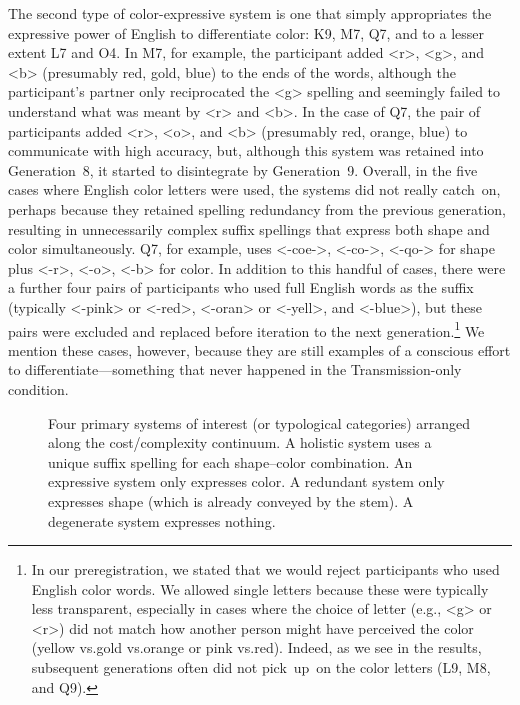 \documentclass[doc,biblatex]{apa7}
\begin{document}
The second type of color-expressive system is one that simply appropriates the expressive power of English to differentiate color: K9, M7, Q7, and to a lesser extent L7 and O4. In M7, for example, the participant added <r>, <g>, and <b> (presumably red, gold, blue) to the ends of the words, although the participant's partner only reciprocated the <g> spelling and seemingly failed to understand what was meant by <r> and <b>. In the case of Q7, the pair of participants added <r>, <o>, and <b> (presumably red, orange, blue) to communicate with high accuracy, but, although this system was retained into Generation~8, it started to disintegrate by Generation~9. Overall, in the five cases where English color letters were used, the systems did not really catch~on, perhaps because they retained spelling redundancy from the previous generation, resulting in unnecessarily complex suffix spellings that express both shape and color simultaneously. Q7, for example, uses <-coe->, <-co->, <-qo-> for shape plus <-r>, <-o>, <-b> for color. In addition to this handful of cases, there were a further four pairs of participants who used full English words as the suffix (typically <-pink> or <-red>, <-oran> or <-yell>, and <-blue>), but these pairs were excluded and replaced before iteration to the next generation.\footnote{In our preregistration, we stated that we would reject participants who used English color words. We allowed single letters because these were typically less transparent, especially in cases where the choice of letter (e.g., <g> or <r>) did not match how another person might have perceived the color (yellow vs.\@ gold vs.\@ orange or pink vs.\@ red). Indeed, as we see in the results, subsequent generations often did not pick~up~on the color letters (L9, M8, and Q9).} We mention these cases, however, because they are still examples of a conscious effort to differentiate---something that never happened in the Transmission-only condition.

	\begin{figure}
	\vspace*{2pt}
	\caption{Four primary systems of interest (or typological categories) arranged along the cost/complexity continuum. A holistic system uses a unique suffix spelling for each shape--color combination. An expressive system only expresses color. A redundant system only expresses shape (which is already conveyed by the stem). A degenerate system expresses nothing.}
	\label{typology}
	\end{figure}
\end{document}
